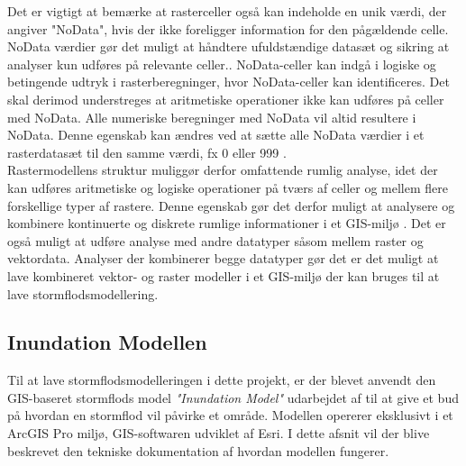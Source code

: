 Det er vigtigt at bemærke at rasterceller også kan indeholde en unik værdi, der angiver "NoData", hvis der ikke foreligger information for den pågældende celle. NoData værdier gør det muligt at håndtere ufuldstændige datasæt og sikring at analyser kun udføres på relevante celler.\citep{bolstad_gis_2022, longley_geographical_2008}. NoData-celler kan indgå i logiske og betingende udtryk i rasterberegninger, hvor NoData-celler kan identificeres. Det skal derimod understreges at aritmetiske operationer ikke kan udføres på celler med NoData. Alle numeriske beregninger med NoData vil altid resultere i NoData. Denne egenskab kan ændres ved at sætte alle NoData værdier i et rasterdatasæt til den samme værdi, fx 0 eller 999 \citep{bolstad_gis_2022}.\\

Rastermodellens struktur muliggør derfor omfattende rumlig analyse, idet der kan udføres aritmetiske og logiske operationer på tværs af celler og mellem flere forskellige typer af rastere. Denne egenskab gør det derfor muligt at analysere og kombinere kontinuerte og diskrete rumlige informationer i et GIS-miljø  \citep{bolstad_gis_2022, longley_geographical_2008}. Det er også muligt at udføre analyse med andre datatyper såsom mellem raster og vektordata. Analyser der kombinerer begge datatyper gør det er det muligt at lave kombineret vektor- og raster modeller i et GIS-miljø der kan bruges til at lave stormflodsmodellering.

\subsection{Inundation Modellen} \label{Afsnit: Inundation Model}

Til at lave stormflodsmodelleringen i dette projekt, er der blevet anvendt den GIS-baseret stormflods model  \textit{"Inundation Model"} udarbejdet af \cite{balstrom_kirby_inundation} til at give et bud på hvordan en stormflod vil påvirke et område. Modellen opererer eksklusivt i et ArcGIS Pro miljø, GIS-softwaren udviklet af Esri. I dette afsnit vil der blive beskrevet den tekniske dokumentation af hvordan modellen fungerer.\\

